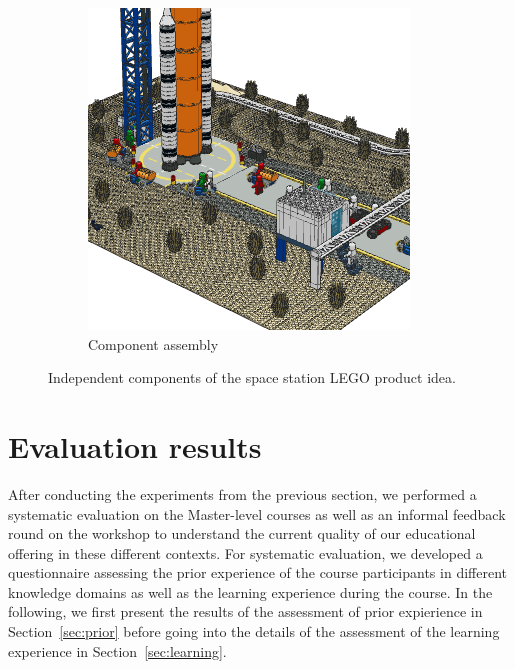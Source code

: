 \documentclass{PDS}
\begin{document}
\begin{figure}[htbp]
\begin{subfigure}[b]{0.4\textwidth}
    \end{subfigure}
    \hspace{0.05\textwidth}
    \begin{subfigure}[b]{0.2\textwidth}
        \includegraphics[width=\textwidth]{./figures/space_assembly.png}
        \caption{Component assembly}
    \end{subfigure}
    \caption{Independent components of the space station LEGO product idea.}
    \label{fig:school-sub}
\end{figure}

\section{Evaluation results}
\label{sec:discussion}

After conducting the experiments from the previous section, we performed a systematic evaluation on the Master-level courses as well as an informal feedback round on the workshop to understand the current quality of our educational offering in these different contexts.
For systematic evaluation, we developed a questionnaire assessing the prior experience of the course participants in different knowledge domains as well as the learning experience during the course.
In the following, we first present the results of the assessment of prior expierience in Section~\ref{sec:prior} before going into the details of the assessment of the learning experience in Section~\ref{sec:learning}.
\end{document}
